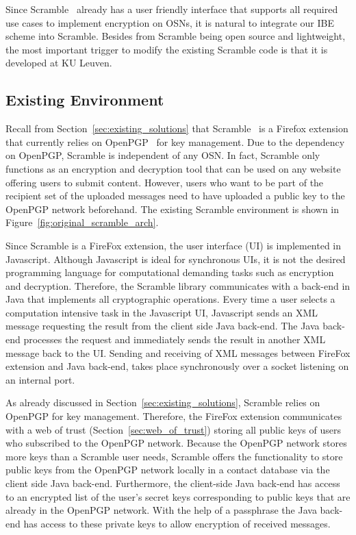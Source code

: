 Since Scramble~\cite{art:BeatoKW11} already has a user friendly interface that supports all required use cases to implement encryption on OSNs, it is natural to integrate our IBE scheme into Scramble. Besides from Scramble being open source and lightweight, the most important trigger to modify the existing Scramble code is that it is developed at KU Leuven.

\subsection{Existing Environment}
Recall from Section~\ref{sec:existing_solutions} that Scramble~\cite{art:BeatoKW11} is a Firefox extension that currently relies on OpenPGP~\cite{rfc4880} for key management. Due to the dependency on OpenPGP, Scramble is independent of any OSN. In fact, Scramble only functions as an encryption and decryption tool that can be used on any website offering users to submit content. However, users who want to be part of the recipient set of the uploaded messages need to have uploaded a public key to the OpenPGP network beforehand. The existing Scramble environment is shown in Figure~\ref{fig:original_scramble_arch}.

Since Scramble is a FireFox extension, the user interface (UI) is implemented in Javascript. Although Javascript is ideal for synchronous UIs, it is not the desired programming language for computational demanding tasks such as encryption and decryption. Therefore, the Scramble library communicates with a back-end in Java that implements all cryptographic operations. Every time a user selects a computation intensive task in the Javascript UI, Javascript sends an XML message requesting the result from the client side Java back-end. The Java back-end processes the request and immediately sends the result in another XML message back to the UI. Sending and receiving of XML messages between FireFox extension and Java back-end, takes place synchronously over a socket listening on an internal port.

As already discussed in Section~\ref{sec:existing_solutions}, Scramble relies on OpenPGP for key management. Therefore, the FireFox extension communicates with a web of trust (Section~\ref{sec:web_of_trust}) storing all public keys of users who subscribed to the OpenPGP network. Because the OpenPGP network stores more keys than a Scramble user needs, Scramble offers the functionality to store public keys from the OpenPGP network locally in a contact database via the client side Java back-end. Furthermore, the client-side Java back-end has access to an encrypted list of the user's secret keys corresponding to public keys that are already in the OpenPGP network. With the help of a passphrase the Java back-end has access to these private keys to allow encryption of received messages.



